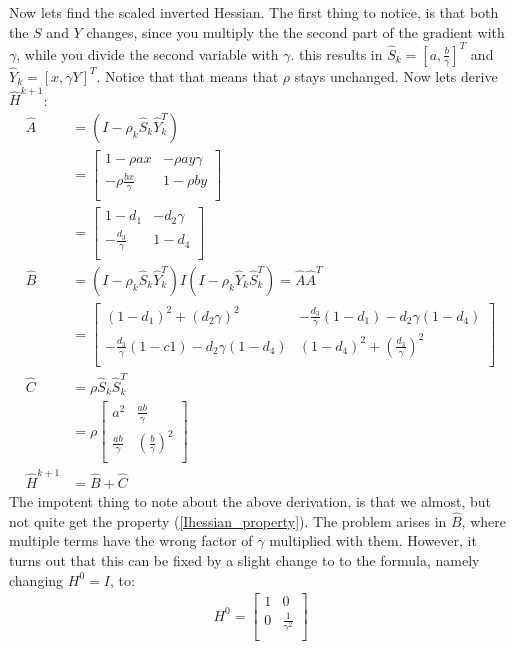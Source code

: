 \documentclass[11pt,a4paper]{article}
\begin{document}
Now lets find the scaled inverted Hessian. The first thing to notice, is that both the $S$ and $Y$ changes, since you multiply the the second part of the gradient with $\gamma$, while you divide the second variable with $\gamma$. this results in $\hat{S}_k=[a,\frac{b}{\gamma}]^T$ and $\hat{Y}_k=[x,\gamma Y]^T$. Notice that that means that $\rho$ stays unchanged. Now lets derive $\hat{H}^{k+1}$:
\begin{align*}
\hat{A} &= (I-\rho_k\hat{S}_k\hat{Y}_k^T) \\
&=\left[ \begin{array}{cc}
   	1-\rho ax & -\rho ay\gamma\\
    	-\rho \frac{bx}{\gamma}& 1-\rho by\\
   \end{array}  \right] \\
&=\left[ \begin{array}{cc}
   	1-d_1 & -d_2\gamma\\
    	-\frac{d_3}{\gamma}& 1-d_4\\
   \end{array}  \right] \\
\hat{B} &= (I-\rho_k\hat{S}_k\hat{Y}_k^T)I(I-\rho_k\hat{Y}_k\hat{S}_k^T) = \hat{A}\hat{A}^T \\
&=\left[ \begin{array}{cc}
   	(1-d_1)^2 + (d_2\gamma)^2& -\frac{d_3}{\gamma}(1-d_1) -d_2\gamma(1-d_4)\\
    	-\frac{d_3}{\gamma}(1-c1)-d_2\gamma(1-d_4)& (1-d_4)^2 +(\frac{d_3}{\gamma})^2\\
   \end{array}  \right] \\
\hat{C}&= \rho \hat{S}_k\hat{S}_k^T \\
&=\rho\left[ \begin{array}{cc}
   	a^2  & \frac{ab}{\gamma}\\
    	\frac{ab}{\gamma}& (\frac{b}{\gamma})^2\\
   \end{array}  \right] \\
\hat{H}^{k+1}&=\hat{B}+\hat{C}
\end{align*}
The impotent thing to note about the above derivation, is that we almost, but not quite get the property (\ref{Ihessian_property}). The problem arises in $\hat{B}$, where multiple terms have the wrong factor of $\gamma$ multiplied with them. However, it turns out that this can be fixed by a slight change to to the formula, namely changing $H^0=I$, to:
\begin{align*}
	H^0 = \left[ \begin{array}{cc}
   	1 & 0\\
    	0& \frac{1}{\gamma^2}\\
   \end{array}  \right]
\end{align*}
\end{document}
